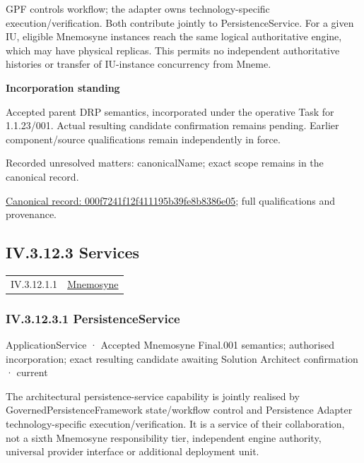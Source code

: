 GPF controls workflow; the adapter owns technology-specific execution/verification. Both contribute jointly to PersistenceService. For a given IU, eligible Mnemosyne instances reach the same logical authoritative engine, which may have physical replicas. This permits no independent authoritative histories or transfer of IU-instance concurrency from Mneme.



\par\medskip\textbf{Incorporation standing}\par


Accepted parent DRP semantics, incorporated under the operative Task for 1.1.23/001. Actual resulting candidate confirmation remains pending. Earlier component/source qualifications remain independently in force.


{\small Recorded unresolved matters: canonicalName; exact scope remains in the canonical record.}\par
{\footnotesize \href{../../../../continuum/application/application-function/000f7241f12f411195b39fe8b8386e05.md}{Canonical record: 000f7241f12f411195b39fe8b8386e05}; full qualifications and provenance.}\par
\subsection*{IV.3.12.3 Services}
\label{navigation:IV.3.12.3}

\begin{longtable}{p{.22\linewidth}p{.73\linewidth}}
IV.3.12.1.1 & \hyperref[element:7985e647bf9e4ca3ba70faf9e3e4ae02]{Mnemosyne} \\
\end{longtable}
\subsubsection*{IV.3.12.3.1 PersistenceService}
\label{navigation:IV.3.12.3.1}

\label{element:c050edfefe8b4d2b8892bc94b2d27a5c}
{\small ApplicationService · Accepted Mnemosyne Final.001 semantics; authorised incorporation; exact resulting candidate awaiting Solution Architect confirmation · current}\par

The architectural persistence-service capability is jointly realised by GovernedPersistenceFramework state/workflow control and Persistence Adapter technology-specific execution/verification. It is a service of their collaboration, not a sixth Mnemosyne responsibility tier, independent engine authority, universal provider interface or additional deployment unit.



